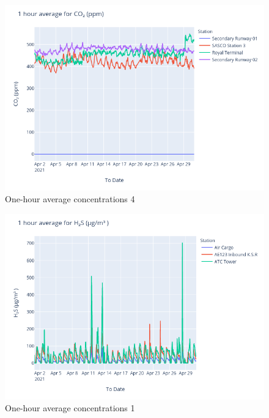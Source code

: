 \documentclass[12pt, oneside]{book}
\begin{document}
{
{\begin{figure}[H]
\centering
\includegraphics[width=\textwidth]{image224}
\caption{One-hour average  concentrations 4}\label{image224}
\end{figure}}{}


{\begin{figure}[H]
\centering
\includegraphics[width=\textwidth]{image189}
\caption{One-hour average  concentrations 1}\label{image189}
\end{figure}}{}

}
\end{document}

